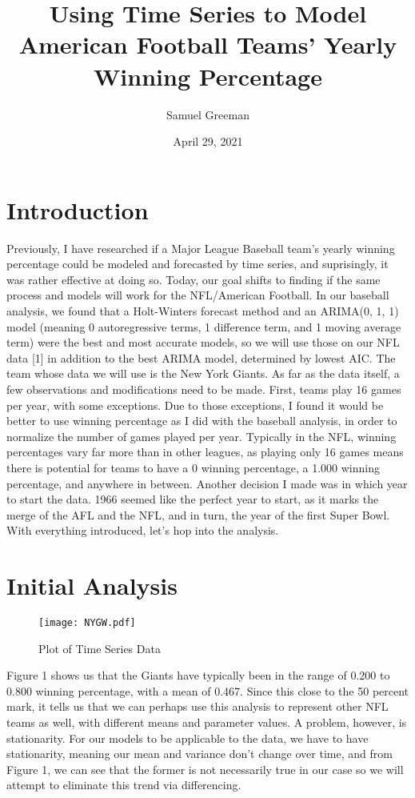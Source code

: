 \documentclass[12pt]{article}
\author{Samuel Greeman}
\title{Using Time Series to Model American Football Teams' Yearly Winning Percentage}
\date{April 29, 2021}
\begin{document}
\maketitle 



\setdefaultleftmargin{0pt}{}{}{}{}{}

\section{Introduction}\label{sec:intro}
Previously, I have researched if a Major League Baseball team's yearly winning percentage could be modeled and forecasted by time series, and suprisingly, it was rather effective at doing so. Today, our goal shifts to finding if the same process and models will work for the NFL/American Football. In our baseball analysis, we found that a Holt-Winters forecast method and an ARIMA(0, 1, 1) model (meaning 0 autoregressive terms, 1 difference term, and 1 moving average term) were the best and most accurate models, so we will use those on our NFL data [1] in addition to the best ARIMA model, determined by lowest AIC. The team whose data we will use is the New York Giants. As far as the data itself, a few observations and modifications need to be made. First, teams play 16 games per year, with some exceptions. Due to those exceptions, I found it would be better to use winning percentage as I did with the baseball analysis, in order to normalize the number of games played per year. Typically in the NFL, winning percentages vary far more than in other leagues, as playing only 16 games means there is potential for teams to have a 0 winning percentage, a 1.000 winning percentage, and anywhere in between. Another decision I made was in which year to start the data. 1966 seemed like the perfect year to start, as it marks the merge of the AFL and the NFL, and in turn, the year of the first Super Bowl. With everything introduced, let's hop into the analysis.\\
\newpage

\section{Initial Analysis}\label{sec:chapter}
\begin{figure}[h!]
\centering
\texttt{[image: NYGW.pdf]}
\caption{Plot of Time Series Data}
\label{fig:Figure 1}
\end{figure}
Figure 1 shows us that the Giants have typically been in the range of 0.200 to 0.800 winning percentage, with a mean of 0.467. Since this close to the 50 percent mark, it tells us that we can perhaps use this analysis to represent other NFL teams as well, with different means and parameter values. A problem, however, is stationarity. For our models to be applicable to the data, we have to have stationarity, meaning our mean and variance don't change over time, and from Figure 1, we can see that the former is not necessarily true in our case so we will attempt to eliminate this trend via differencing.\\
\end{document}

